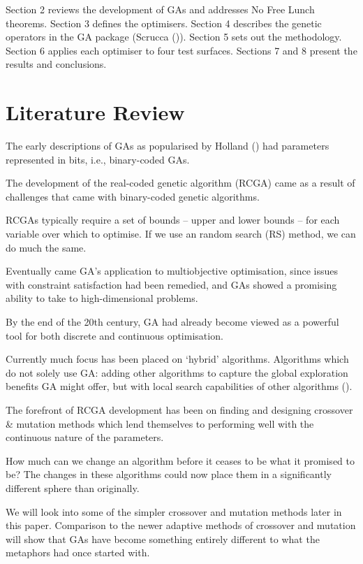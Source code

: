 \documentclass[
  a4paper,
  DIV=11,
  numbers=noendperiod]{scrartcl}
\newcommand{\+}{\phantom{-}}
\begin{document}
Section 2 reviews the development of GAs and addresses No Free Lunch
theorems. Section 3 defines the optimisers. Section 4 describes the
genetic operators in the GA package (Scrucca
()). Section 5 sets out the methodology.
Section 6 applies each optimiser to four test surfaces. Sections 7 and 8
present the results and conclusions.

\newpage

\section{Literature Review}\label{literature-review}

The early descriptions of GAs as popularised by Holland
() had parameters represented in bits,
i.e., binary-coded GAs.

The development of the real-coded genetic algorithm (RCGA) came as a
result of challenges that came with binary-coded genetic algorithms.

RCGAs typically require a set of bounds -- upper and lower bounds -- for
each variable over which to optimise. If we use an random search (RS)
method, we can do much the same.

Eventually came GA's application to multiobjective optimisation, since
issues with constraint satisfaction had been remedied, and GAs showed a
promising ability to take to high-dimensional problems.

By the end of the 20th century, GA had already become viewed as a
powerful tool for both discrete and continuous optimisation.

Currently much focus has been placed on `hybrid' algorithms. Algorithms
which do not solely use GA: adding other algorithms to capture the
global exploration benefits GA might offer, but with local search
capabilities of other algorithms ().

The forefront of RCGA development has been on finding and designing
crossover \& mutation methods which lend themselves to performing well
with the continuous nature of the parameters.

How much can we change an algorithm before it ceases to be what it
promised to be? The changes in these algorithms could now place them in
a significantly different sphere than originally.

We will look into some of the simpler crossover and mutation methods
later in this paper. Comparison to the newer adaptive methods of
crossover and mutation will show that GAs have become something entirely
different to what the metaphors had once started with.
\end{document}
